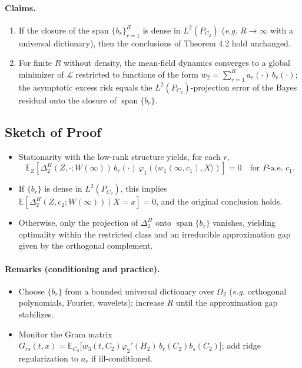 \documentclass{article}
\begin{document}
\paragraph{Claims.}
\begin{enumerate}[leftmargin=1.5em]
    \item[(i)] If the closure of the span $\{b_{r}\}_{r=1}^{R}$ is dense in $L^2(P_{C_2})$ (\emph{e.g.} $R\to\infty$ with a universal dictionary), then the conclusions of Theorem 4.2 hold unchanged.
    \item[(ii)] For finite $R$ without density, the mean-field dynamics converges to a global minimizer of $\mathscr{L}$ restricted to functions of the form $w_2 = \sum_{r=1}^{R} a_r(\cdot)\,b_r(\cdot)$; the asymptotic excess risk equals the $L^2(P_{C_2})$-projection error of the Bayes residual onto the closure of $\operatorname{span}\{b_r\}$.
\end{enumerate}

\subsection*{Sketch of Proof}
\begin{itemize}[leftmargin=1.5em]
    \item Stationarity with the low-rank structure yields, for each $r$,
    \[
        \mathbb{E}_{Z}\!\left[ \Delta_{2}^{H}(Z, \cdot; W(\infty))\, b_r(\cdot)\, \varphi_{1}(\langle w_1(\infty,c_1), X\rangle) \right]=0 \quad \text{for $P$-a.e. $c_1$}.
    \]
    \item If $\{b_r\}$ is dense in $L^2(P_{C_2})$, this implies $\mathbb{E}\!\left[ \Delta_2^H(Z, c_2; W(\infty)) \mid X = x \right] = 0$, and the original conclusion holds.
    \item Otherwise, only the projection of $\Delta_2^H$ onto $\operatorname{span}\{b_r\}$ vanishes, yielding optimality within the restricted class and an irreducible approximation gap given by the orthogonal complement.
\end{itemize}

\paragraph{Remarks (conditioning and practice).}
\begin{itemize}[leftmargin=1.5em]
    \item Choose $\{b_r\}$ from a bounded universal dictionary over $\Omega_2$ (\emph{e.g.} orthogonal polynomials, Fourier, wavelets); increase $R$ until the approximation gap stabilizes.
    \item Monitor the Gram matrix $G_{rs}(t,x) = \mathbb{E}_{C_2}\!\big[w_3(t,C_2)\varphi_2'(H_2)\,b_r(C_2) b_s(C_2)\big]$; add ridge regularization to $a_r$ if ill-conditioned.
\end{itemize}
\end{document}
